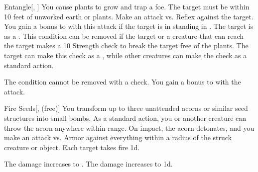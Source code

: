 \lowercase{\hypertarget{spell:Entangle}{}}\label{spell:Entangle}
\begin{freeability}[Rank 3]{\hypertarget{spell:Entangle}{Entangle}}[, ]
You cause plants to grow and trap a foe.
The target must be within 10 feet of unworked earth or plants.
Make an attack vs. Reflex against the target.
You gain a  bonus to  with this attack if the target is in standing in .
\hit The target is  as a .
This condition can be removed if the target or a creature that can reach the target makes a  10 Strength check to break the target free of the plants.
The target can make this check as a , while other creatures can make the check as a standard action.

\rankline
{} The condition cannot be removed with a check.
 You gain a  bonus to  with the attack.

\end{freeability}
\vspace{0.25em}



\lowercase{\hypertarget{spell:Fire Seeds}{}}\label{spell:Fire Seeds}
\begin{freeability}[Rank 3]{\hypertarget{spell:Fire Seeds}{Fire Seeds}}[,  (free)]
You transform up to three unattended acorns or similar seed structures into small bombs.
As a standard action, you or another creature can throw the acorn anywhere within \rngclose range.
On impact, the acorn detonates, and you make an attack vs. Armor against everything within a \areasmall radius of the struck creature or object.
\hit Each target takes fire  \minus1d.

\rankline
{} The damage increases to .
 The damage increases to  \plus1d.

\end{freeability}
\vspace{0.25em}



